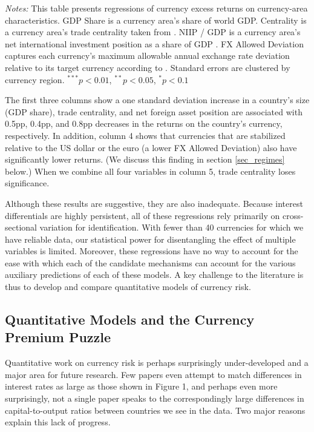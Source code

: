 \documentclass[11pt]{article}
\begin{document}
\begin{table}[htp]
\begin{minipage}[htp!]{\textwidth}
\scriptsize
\emph{Notes:} This table presents regressions of currency excess returns on currency-area characteristics. GDP Share is a currency area's share of world GDP. Centrality is a currency area's trade centrality taken from \citet{Richmond2019}. NIIP / GDP is a currency area's net international investment position as a share of GDP \citep{DellaCorteetal2016}. FX Allowed Deviation captures each currency's maximum allowable annual exchange rate deviation relative to its target currency according to \citet{ilzetzki2018exchange}. Standard errors are clustered by currency region. $^{***}p<0.01$, $^{**}p<0.05$, $^*p<0.1$
\end{minipage}
\end{table}

The first three columns show a one standard deviation increase in a country's size (GDP share), trade centrality, and net foreign asset position are associated with 0.5pp, 0.4pp, and 0.8pp decreases in the returns on the country's currency, respectively. In addition, column 4 shows that currencies that are stabilized relative to the US dollar or the euro (a lower FX Allowed Deviation) also have significantly lower returns. (We discuss this finding in section \ref{sec_regimes} below.) When we combine all four variables in column 5, trade centrality loses significance.

Although these results are suggestive, they are also inadequate. Because interest differentials are highly persistent, all of these regressions rely primarily on cross-sectional variation for identification.  With fewer than 40 currencies for which we have reliable data, our statistical power for disentangling the effect of multiple variables is limited. Moreover, these regressions have no way to account for the ease with which each of the candidate mechanisms can account for the various auxiliary predictions of each of these models. A key challenge to the literature is thus to develop and compare quantitative models of currency risk.


\subsection{Quantitative Models and the Currency Premium Puzzle \label{section:cpp}}

Quantitative work on currency risk is perhaps surprisingly under-developed and a major area for future research. Few papers even attempt to match differences in interest rates as large as those shown in Figure 1, and perhaps even more surprisingly, not a single paper speaks to the correspondingly large differences in capital-to-output ratios between countries we see in the data. Two major reasons explain this lack of progress.
\end{document}
